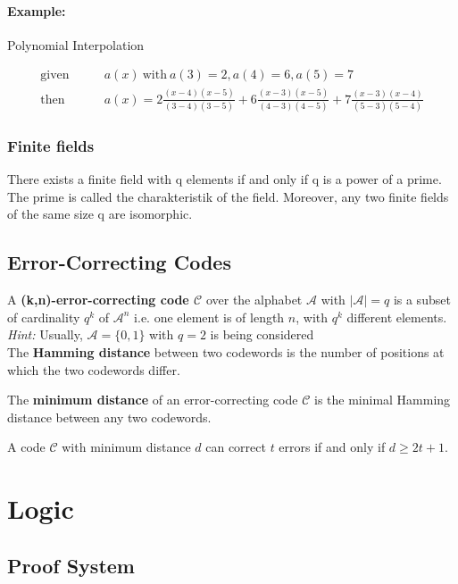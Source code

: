 \documentclass[11pt]{article}
\begin{document}
\paragraph{Example:} Polynomial Interpolation

\begin{equation*}
\begin{split}
	\text{given}\qquad & a(x)\ \text{with}\ a(3) = 2, a(4) = 6, a(5) = 7 \\
	\text{then}\qquad & a(x) = 2\frac{(x-4)(x-5)}{(3-4)(3-5)}+6\frac{(x-3)(x-5)}{(4-3)(4-5)}+7\frac{(x-3)(x-4)}{(5-3)(5-4)} 
\end{split}
\end{equation*}
\subsubsection{Finite fields}
 There exists a finite field with q elements if and only if q is a power of a prime. The prime is called the charakteristik of the field. Moreover, any two finite fields of the same size q are isomorphic.
\subsection{Error-Correcting Codes}

A \textbf{(k,n)-error-correcting code $\mathcal{C}$} over the alphabet $\mathcal{A}$ with $|\mathcal{A}| = q$ is a subset of cardinality $q^k$ of $\mathcal{A}^n$ i.e. one element is of length $n$, with $q^k$ different elements. \\

\emph{Hint:} Usually, $\mathcal{A} = \{0, 1\}$ with $q = 2$ is being considered \\

The \textbf{Hamming distance} between two codewords is the number of positions at which the two codewords differ.

The \textbf{minimum distance} of an error-correcting code $\mathcal{C}$ is the minimal Hamming distance between any two codewords.

A code $\mathcal{C}$ with minimum distance $d$ can correct $t$ errors if and only if $d \geq 2t + 1$.

\section{Logic}

\subsection{Proof System}
\end{document}
